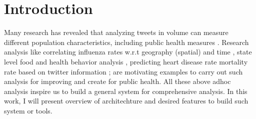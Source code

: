 \section*{Introduction}
\label{sec:intro}
Many research has revealed that analyzing tweets in volume can measure different population characteristics, including public
health measures \cite{paul2011you, paul2012model, eichstaedt2015psychological, barros2018disease, mueller2018crowdbreaks, karami2018characterizing}.
Research analysis like correlating influenza rates w.r.t geography (spatial) and time \cite{signorini2011use}, state level food and health behavior analysis \cite{nguyen2017social}, predicting heart disease rate mortality rate based on twitter information \cite{eichstaedt2015psychological}; are motivating examples to carry out such analysis for improving and create for public health.
All these above adhoc analysis inspire us to build a general system for comprehensive analysis.
In this work, I will present overview of architechture and desired features to build such system or tools.




